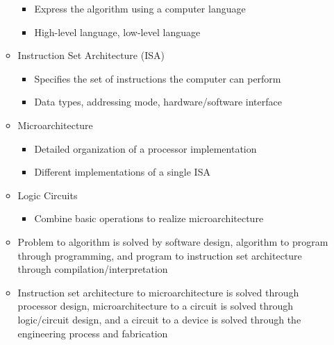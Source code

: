 \begin{itemize}
\begin{itemize}
\begin{itemize}
          \item Express the algorithm using a computer language

          \item High-level language, low-level language

        \end{itemize}

      \item Instruction Set Architecture (ISA)

        \begin{itemize}

          \item Specifies the set of instructions the computer can perform

          \item Data types, addressing mode, hardware/software interface

        \end{itemize}

      \item Microarchitecture

        \begin{itemize}

          \item Detailed organization of a processor implementation

          \item Different implementations of a single ISA

        \end{itemize}

      \item Logic Circuits

        \begin{itemize}

          \item Combine basic operations to realize microarchitecture

        \end{itemize}

      \item Problem to algorithm is solved by software design, algorithm to program through programming, and program to instruction set architecture through compilation/interpretation

      \item Instruction set architecture to microarchitecture is solved through processor design, microarchitecture to a circuit is solved through logic/circuit design, and a circuit to a device is solved through the engineering process and fabrication


\end{itemize}
\end{itemize}

